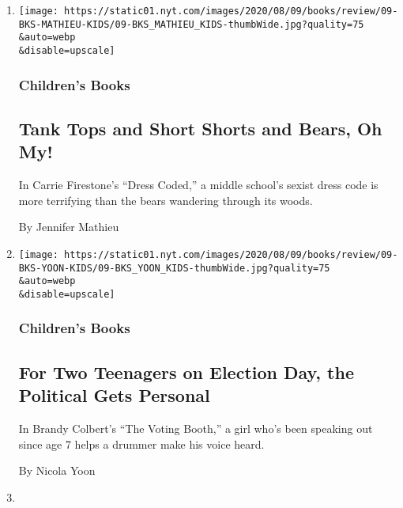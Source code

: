 \begin{enumerate}
\def\labelenumi{\arabic{enumi}.}
\item
  \href{/2020/08/01/books/review/carrie-firestone-dress-coded.html}{}

  \texttt{[image: https://static01.nyt.com/images/2020/08/09/books/review/09-BKS-MATHIEU-KIDS/09-BKS\_MATHIEU\_KIDS-thumbWide.jpg?quality=75\\\&auto=webp\\\&disable=upscale]}

  \hypertarget{childrens-books}{%
  \subsubsection{Children's Books}\label{childrens-books}}

  \hypertarget{tank-tops-and-short-shorts-and-bears-oh-my}{%
  \subsection{Tank Tops and Short Shorts and Bears, Oh
  My!}\label{tank-tops-and-short-shorts-and-bears-oh-my}}

  In Carrie Firestone's ``Dress Coded,'' a middle school's sexist dress
  code is more terrifying than the bears wandering through its woods.

  By Jennifer Mathieu
\item
  \href{/2020/08/01/books/review/brandy-colbert-the-voting-booth.html}{}

  \texttt{[image: https://static01.nyt.com/images/2020/08/09/books/review/09-BKS-YOON-KIDS/09-BKS\_YOON\_KIDS-thumbWide.jpg?quality=75\\\&auto=webp\\\&disable=upscale]}

  \hypertarget{childrens-books-1}{%
  \subsubsection{Children's Books}\label{childrens-books-1}}

  \hypertarget{for-two-teenagers-on-election-day-the-political-gets-personal}{%
  \subsection{For Two Teenagers on Election Day, the Political Gets
  Personal}\label{for-two-teenagers-on-election-day-the-political-gets-personal}}

  In Brandy Colbert's ``The Voting Booth,'' a girl who's been speaking
  out since age 7 helps a drummer make his voice heard.

  By Nicola Yoon
\item
  \href{/2020/07/31/books/review/crime-fiction-megan-miranda.html}{}


\end{enumerate}
